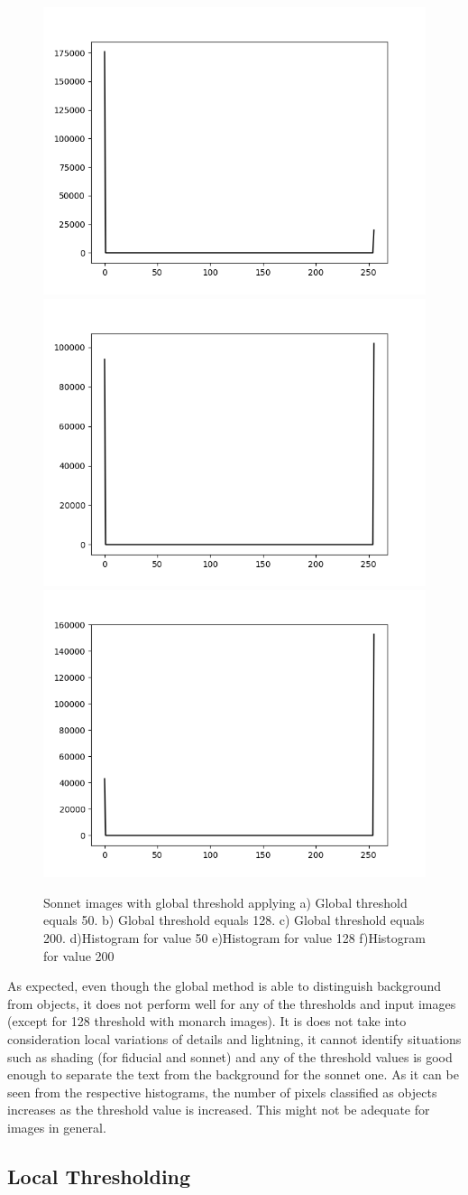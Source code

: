 \documentclass[]{IEEEtran}
\begin{document}
\begin{figure}[H]
  \includegraphics[width=0.3\hsize]{images/global-thresholding/50-threshold/sonnethistogram.png}
  \includegraphics[width=0.3\hsize]{images/global-thresholding/128-threshold/sonnethistogram.png}
  \includegraphics[width=0.3\hsize]{images/global-thresholding/200-threshold/sonnethistogram.png}
  \caption{Sonnet images with global threshold applying a) Global threshold equals 50. b) Global threshold equals 128. c) Global threshold equals 200. d)Histogram for value 50 e)Histogram for value 128 f)Histogram for value 200}
  \label{fig:global-sonnet}
\end{figure}

As expected, even though the global method is able to distinguish background from objects, it does not perform well for any of the thresholds and input images (except for 128 threshold with monarch images). It is does not take into consideration local variations of details and lightning, it cannot identify situations such as shading (for fiducial and sonnet) and any of the threshold values is good enough to separate the text from the background for the sonnet one. As it can be seen from the respective histograms, the number of pixels classified as objects increases as the threshold value is increased. This might not be adequate for images in general.

\subsection{Local Thresholding}
\end{document}
